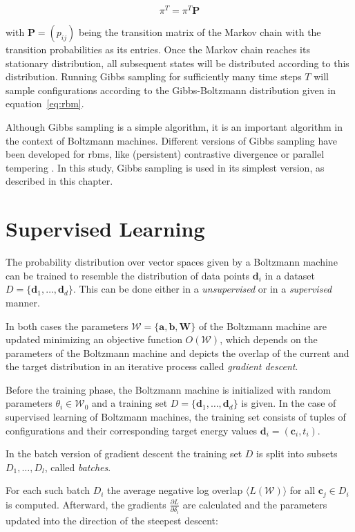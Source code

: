 \begin{equation}
    \pi^T=\pi^T\bm{P}
\end{equation}

with $\bm{P} = (p_{ij})$ being the transition matrix of the Markov chain with the transition probabilities as its entries.
Once the Markov chain reaches its stationary distribution, all subsequent states will be distributed according to this distribution. Running Gibbs sampling for 
sufficiently many time steps $T$ will sample configurations according 
to the Gibbs-Boltzmann distribution given in equation~\ref{eq:rbm}.

Although Gibbs sampling is a simple algorithm, it is an important algorithm in the context of 
Boltzmann machines. Different versions of Gibbs sampling have been developed for \gls{rbm}s, like 
(persistent) contrastive divergence \cite{hinton2002training, tieleman2008training} or parallel tempering \cite{desjardins2010parallel}. In this study,
Gibbs sampling is used in its simplest version, as described in this chapter.
    
\section{Supervised Learning}
\label{sec:learning}
The probability distribution over vector spaces given by a Boltzmann machine can be trained to 
resemble the distribution of data points $\bm{d}_i$ in a dataset $D=\{\bm{d}_1,\dots,\bm{d}_d\}$. This can be done either in a \textit{unsupervised}
or in a \textit{supervised} manner.

In both cases the parameters $\mathcal{W} = \{\bm{a},\bm{b},\bm{W}\}$ of the Boltzmann machine are updated minimizing 
an objective function $O(\mathcal{W})$, which depends on the parameters of the Boltzmann machine and 
depicts the overlap of the current and the target distribution in an iterative process called \textit{gradient descent}.

Before the training phase, the Boltzmann machine is initialized with random parameters $\theta_i \in \mathcal{W}_0$ and a training set 
$D=\{\bm{d}_1,\dots,\bm{d}_d\}$ is given. In the case of supervised learning of Boltzmann machines, the training set consists of tuples of configurations and their corresponding target energy values $\bm{d}_i= (\bm{c}_i, t_i)$.

In the batch version of gradient descent the training set $D$ is 
split into subsets $D_1, \dots, D_l$, called \textit{batches}.

For each such batch $D_i$ the average negative log overlap $\langle L(\mathcal{W})\rangle$ for all $\bm{c}_j \in D_i$
is computed. Afterward, the gradients $\frac{\partial L}{\partial \delta_i}$ are calculated and the parameters updated into
the direction of the steepest descent:

